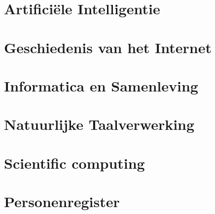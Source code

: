 \documentclass[11pt]{article}
\theoremstyle{definition}
\begin{document}
\section{Artifici\"ele Intelligentie}

\newpage

\section{Geschiedenis van het Internet}

\newpage

\section{Informatica en Samenleving}

\newpage

\section{Natuurlijke Taalverwerking}

\newpage

\section{Scientific computing}

\newpage

\appendix
\section{Personenregister}



\printindex

%
%
\nocite{*}
\end{document}
